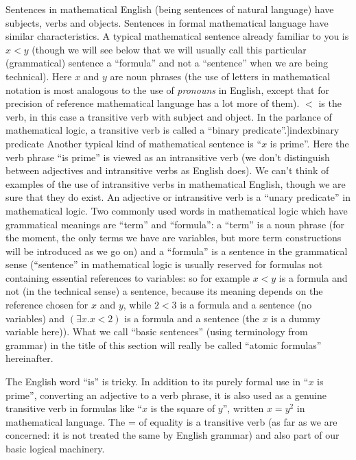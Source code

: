 \documentclass[12pt]{book}
\begin{document}
Sentences in mathematical English (being sentences of natural language) have
subjects, verbs and objects.  Sentences in formal mathematical
language have similar characteristics.  A typical mathematical
sentence already familiar to you is $x < y$ (though we will see below
that we will usually call this particular (grammatical) sentence a
``formula'' and not a ``sentence'' when we are being technical).  Here
$x$ and $y$ are noun phrases (the use of letters in mathematical
notation is most analogous to the use of {\em pronouns\/} in English,
except that for precision of reference mathematical language has a lot
more of them).  $<$ is the verb, in this case a transitive verb with
subject and object.  In the parlance of mathematical logic, a
transitive verb is called a ``binary predicate''.]index{binary predicate}  Another typical
kind of mathematical sentence is ``$x$ is prime''.  Here the verb
phrase ``is prime'' is viewed as an intransitive verb (we don't
distinguish between adjectives and intransitive verbs as English
does).  We can't think of examples of the use of intransitive verbs in
mathematical English, though we are sure that they do exist.  An
adjective or intransitive verb is a ``unary predicate'' in
mathematical logic.  Two commonly used words in mathematical logic
which have grammatical meanings are ``term'' and ``formula'': a
``term'' is a noun phrase (for the moment, the only terms we have are
variables, but more term constructions will be introduced as we go on)
and a ``formula'' is a sentence in the grammatical sense (``sentence''
in mathematical logic is usually reserved for formulas not containing
essential references to variables: so for example $x < y$ is a formula
and not (in the technical sense) a sentence, because its meaning
depends on the reference chosen for $x$ and $y$, while $2<3$ is a
formula and a sentence (no variables) and $(\exists x.x<2)$ is a
formula and a sentence (the $x$ is a dummy variable here)).  What we
call ``basic sentences'' (using terminology from grammar) in the title
of this section will really be called ``atomic formulas'' hereinafter.

The English word ``is'' is tricky.  In addition to its purely formal
use in ``$x$ is prime'', converting an adjective to a verb phrase, it
is also used as a genuine transitive verb in formulas like ``$x$ is
the square of $y$'', written $x=y^2$ in mathematical language.  The =
of equality is a transitive verb (as far as we are concerned: it is
not treated the same by English grammar) and also part of our basic
logical machinery.
\end{document}

